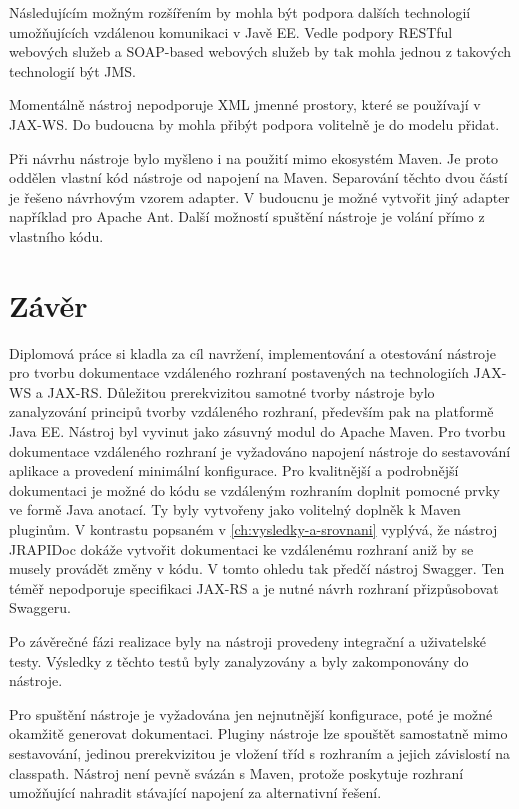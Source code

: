 \documentclass[11pt,twoside,a4paper]{book}
\begin{document}
Následujícím možným rozšířením by mohla být podpora dalších technologií
umožňujících vzdálenou komunikaci v Javě EE. Vedle podpory RESTful webových
služeb a SOAP-based webových služeb by tak mohla jednou z takových technologií
být JMS.

Momentálně nástroj nepodporuje XML jmenné prostory, které se používají v JAX-WS.
Do budoucna by mohla přibýt podpora volitelně je do modelu přidat.

Při návrhu nástroje bylo myšleno i na použití mimo ekosystém Maven. Je proto
oddělen vlastní kód nástroje od napojení na Maven. Separování těchto dvou částí
je řešeno návrhovým vzorem adapter. V budoucnu je možné vytvořit jiný adapter
například pro Apache Ant. Další možností spuštění nástroje je volání přímo z
vlastního kódu.

\chapter{Závěr}

Diplomová práce si kladla za cíl navržení, implementování a otestování nástroje
pro tvorbu dokumentace vzdáleného rozhraní postavených na technologiích JAX-WS a
JAX-RS. Důležitou prerekvizitou samotné tvorby nástroje bylo zanalyzování
principů tvorby vzdáleného rozhraní, především pak na platformě Java EE. Nástroj
byl vyvinut jako zásuvný modul do Apache Maven. Pro tvorbu dokumentace
vzdáleného rozhraní je vyžadováno napojení nástroje do sestavování aplikace a
provedení minimální konfigurace. Pro kvalitnější a podrobnější dokumentaci je
možné do kódu se vzdáleným rozhraním doplnit pomocné
 prvky ve formě Java anotací. Ty byly vytvořeny jako volitelný doplněk k Maven
 pluginům. V kontrastu popsaném v \ref{ch:vysledky-a-srovnani} vyplývá, že
 nástroj JRAPIDoc dokáže vytvořit dokumentaci ke vzdálenému rozhraní aniž by se
 musely provádět změny v kódu. V tomto ohledu tak předčí nástroj Swagger. Ten
 téměř nepodporuje specifikaci JAX-RS a je nutné návrh rozhraní přizpůsobovat
 Swaggeru.
 
Po závěrečné fázi realizace byly na nástroji provedeny integrační a uživatelské
testy.
Výsledky z těchto testů byly zanalyzovány a byly zakomponovány do nástroje.

Pro spuštění nástroje je vyžadována jen nejnutnější konfigurace, poté je možné
okamžitě generovat dokumentaci. Pluginy nástroje lze spouštět samostatně mimo
sestavování, jedinou prerekvizitou je vložení tříd s rozhraním a jejich
závislostí na classpath. Nástroj není pevně svázán s Maven, protože poskytuje
rozhraní umožňující nahradit stávající napojení za alternativní řešení.
\end{document}
